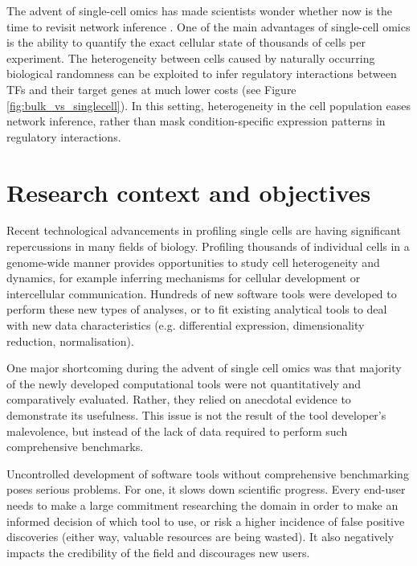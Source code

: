 The advent of single-cell omics has made scientists wonder whether now is the time to revisit network inference \cite{stegle_computationalanalyticalchallenges_2015}. 
One of the main advantages of single-cell omics is the ability to quantify the exact cellular state of thousands of cells per experiment. The heterogeneity between cells caused by naturally occurring biological randomness \cite{padovan-merhar_usingvariabilitygene_2013} can be exploited to infer regulatory interactions between TFs and their target genes at much lower costs (see Figure \ref{fig:bulk_vs_singlecell}).
In this setting, heterogeneity in the cell population eases network inference, rather than mask condition-specific expression patterns in regulatory interactions.

\section{Research context and objectives}
Recent technological advancements in profiling single cells are having significant repercussions in many fields of biology. Profiling thousands of individual cells in a genome-wide manner provides opportunities to study cell heterogeneity and dynamics, for example inferring mechanisms for cellular development or intercellular communication. 
Hundreds of new software tools were developed \cite{zappia_exploringsinglecellrnaseq_2018} to perform these new types of analyses, or to fit existing analytical tools to deal with new data characteristics (e.g. differential expression, dimensionality reduction, normalisation). 

One major shortcoming during the advent of single cell omics was that majority of the newly developed computational tools were not quantitatively and comparatively evaluated. Rather, they relied on anecdotal evidence to demonstrate its usefulness. This issue is not the result of the tool developer's malevolence, but instead of the lack of data required to perform such comprehensive benchmarks.

Uncontrolled development of software tools without comprehensive benchmarking poses serious problems. 
For one, it slows down scientific progress. Every end-user needs to make a large commitment researching the domain in order to make an informed decision of which tool to use, or risk a higher incidence of false positive discoveries (either way, valuable resources are being wasted). It also negatively impacts the credibility of the field and discourages new users. 

